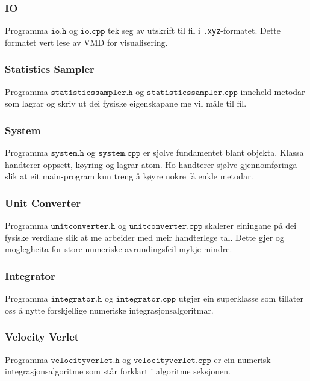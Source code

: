 \documentclass[12pt, a4paper]{article}
\theoremstyle{definition} \newtheorem*{definition}{Teorem}
\begin{document}
        \subsubsection*{IO}
            Programma $\texttt{io.h}$ og $\texttt{io.cpp}$ tek seg av utskrift til fil i \verb!.xyz!-formatet. Dette formatet vert lese av VMD for visualisering.

        \subsubsection*{Statistics Sampler}
            Programma $\texttt{statisticssampler.h}$ og $\texttt{statisticssampler.cpp}$ inneheld metodar som lagrar og skriv ut dei fysiske eigenskapane me vil måle til fil.

        \subsubsection*{System}
            Programma $\texttt{system.h}$ og $\texttt{system.cpp}$ er sjølve fundamentet blant objekta. Klassa handterer oppsett, køyring og lagrar atom. Ho handterer 
            sjølve gjennomføringa slik at eit main-program kun treng å køyre nokre få enkle metodar.

        \subsubsection*{Unit Converter}
            Programma $\texttt{unitconverter.h}$ og $\texttt{unitconverter.cpp}$ skalerer einingane på dei fysiske verdiane slik at me arbeider med meir handterlege tal.
            Dette gjer og moglegheita for store numeriske avrundingsfeil mykje mindre.

        \subsubsection*{Integrator}
            Programma $\texttt{integrator.h}$ og $\texttt{integrator.cpp}$ utgjer ein superklasse som tillater oss å nytte forskjellige numeriske integrasjonsalgoritmar.

        \subsubsection*{Velocity Verlet}
            Programma $\texttt{velocityverlet.h}$ og $\texttt{velocityverlet.cpp}$ er ein numerisk integrasjonsalgoritme som står forklart i algoritme seksjonen.
\end{document}
